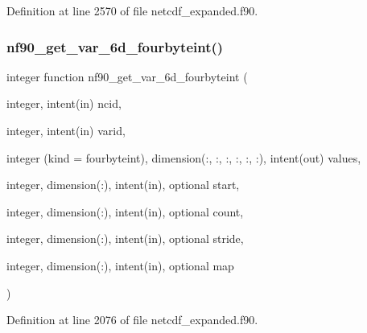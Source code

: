 Definition at line 2570 of file netcdf\+\_\+expanded.\+f90.

\mbox{\label{netcdf__expanded_8f90_a54887ba654e7e855249046e945eb9dc6}} 
\subsubsection{\texorpdfstring{nf90\+\_\+get\+\_\+var\+\_\+6d\+\_\+fourbyteint()}{nf90\_get\_var\_6d\_fourbyteint()}}
{\footnotesize\ttfamily integer function nf90\+\_\+get\+\_\+var\+\_\+6d\+\_\+fourbyteint (\begin{DoxyParamCaption}\item[{integer, intent(in)}]{ncid,  }\item[{integer, intent(in)}]{varid,  }\item[{integer (kind = fourbyteint), dimension(\+:, \+:, \+:, \+:, \+:, \+:), intent(out)}]{values,  }\item[{integer, dimension(\+:), intent(in), optional}]{start,  }\item[{integer, dimension(\+:), intent(in), optional}]{count,  }\item[{integer, dimension(\+:), intent(in), optional}]{stride,  }\item[{integer, dimension(\+:), intent(in), optional}]{map }\end{DoxyParamCaption})}



Definition at line 2076 of file netcdf\+\_\+expanded.\+f90.

\mbox{\label{netcdf__expanded_8f90_a4e533b8db3316390515ed2a7b07f571e}} 
